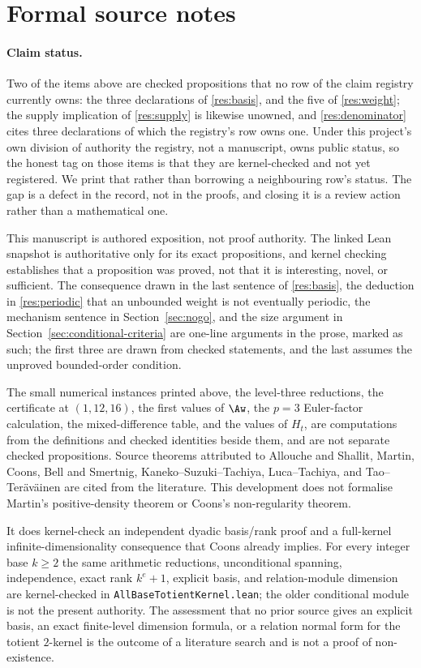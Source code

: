 \section*{Formal source notes}

\paragraph{Claim status.}
Two of the items above are checked propositions that no row of the claim
registry currently owns: the three declarations of \ref{res:basis}, and the
five of \ref{res:weight}; the supply implication of \ref{res:supply} is
likewise unowned, and \ref{res:denominator} cites three declarations of which
the registry's row owns one.  Under this project's own division of authority
the registry, not a manuscript, owns public status, so the honest tag on those
items is that they are kernel-checked and not yet registered.  We print that
rather than borrowing a neighbouring row's status.  The gap is a defect in the
record, not in the proofs, and closing it is a review action rather than a
mathematical one.

This manuscript is authored exposition, not proof authority.  The linked Lean
snapshot is authoritative only for its exact propositions, and kernel checking
establishes that a proposition was proved, not that it is interesting, novel,
or sufficient.  The consequence drawn in the last sentence of \ref{res:basis},
the deduction in \ref{res:periodic} that an unbounded weight is not eventually
periodic, the mechanism sentence in Section~\ref{sec:nogo}, and the size
argument in Section~\ref{sec:conditional-criteria} are one-line arguments in the prose,
marked as such; the first three are drawn from checked statements, and the
last assumes the unproved bounded-order condition.

The small numerical
instances printed above, the level-three reductions, the certificate at
$(1,12,16)$, the first values of $\Aw$, the $p=3$ Euler-factor calculation,
the mixed-difference table, and the values of $H_t$, are computations from
the definitions and checked identities beside them, and are not separate
checked propositions.  Source theorems attributed to Allouche and Shallit,
Martin, Coons, Bell and Smertnig, Kaneko--Suzuki--Tachiya, Luca--Tachiya, and
Tao--Ter\"av\"ainen are cited from the literature.  This development does not
formalise Martin's positive-density theorem or Coons's non-regularity theorem.

It does kernel-check an independent dyadic basis/rank proof and a full-kernel
infinite-dimensionality consequence that Coons already implies.  For every
integer base $k\ge2$ the same arithmetic reductions, unconditional spanning,
independence, exact rank $k^e+1$, explicit basis, and relation-module dimension
are kernel-checked in \texttt{AllBaseTotientKernel.lean}; the older conditional
module is not the present authority.  The
assessment that no prior source gives an explicit basis, an exact finite-level
dimension formula, or a relation normal form for the totient $2$-kernel is the
outcome of a literature search and is not a proof of non-existence.

